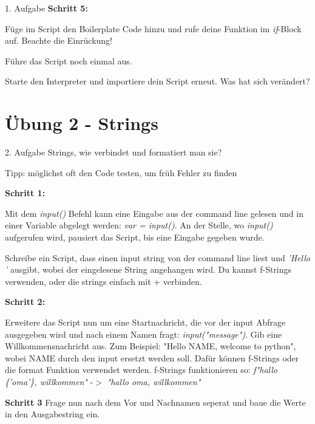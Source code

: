 \begin{frame}{1. Aufgabe}
	\textbf{Schritt 5:}
	
	Füge im Script den Boilerplate Code hinzu und rufe deine Funktion im \textit{if}-Block auf. Beachte die Einrückung!
	
	
	
	Führe das Script noch einmal aus.
	
	Starte den Interpreter und importiere dein Script erneut. Was hat sich verändert?
\end{frame}

\section{Übung 2 - Strings}

\begin{frame}{2. Aufgabe}
	Strings, wie verbindet und formatiert man sie?
	
	Tipp: möglichst oft den Code testen, um früh Fehler zu finden
	
	\textbf{Schritt 1:}
	
	Mit dem \textit{input()} Befehl kann eine Eingabe aus der command line gelesen und in einer Variable abgelegt werden: \textit{var = input()}. An der Stelle, wo \textit{input()} aufgerufen wird, pausiert das Script, bis eine Eingabe gegeben wurde.
	
	Schreibe ein Script, dass einen input string von der command line liest und \textit{'Hello '} ausgibt, wobei der eingelesene String angehangen wird. Du kannst f-Strings verwenden, oder die strings einfach mit + verbinden.
\end{frame}
\begin{frame}
	\textbf{Schritt 2:}
	
	Erweitere das Script nun um eine Startnachricht, die vor der input Abfrage ausgegeben wird und nach einem Namen fragt: \textit{input("message")}. Gib eine Willkommensnachricht aus. Zum Beispiel: "Hello NAME, welcome to python", wobei NAME durch den input ersetzt werden soll. Dafür können f-Strings oder die format Funktion verwendet werden.
	\linebreak
	f-Strings funktionieren so: \textit{f"hallo \{'oma'\}, willkommen"} -$>$ \textit{"hallo oma, willkommen"}
	\linebreak
	
	\textbf{Schritt 3}	
	Frage nun nach dem Vor und Nachnamen seperat und baue die Werte in den Ausgabestring ein.
\end{frame}


